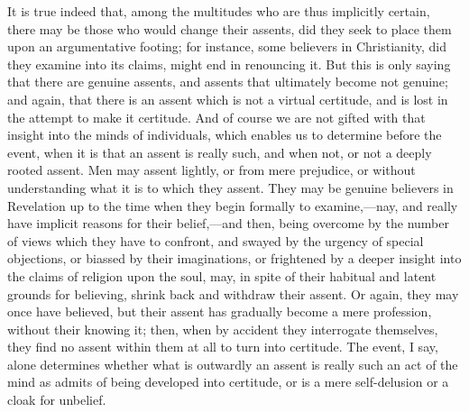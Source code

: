 It is true indeed that, among the multitudes who are thus
implicitly certain, there may be those who would change their assents,
did they seek to place them upon an argumentative footing; for
instance, some believers in Christianity, did they examine into its
claims, might end in renouncing it. But this is only saying that there
are genuine assents, and assents that ultimately become not genuine;
and again, that there is an assent which is not a virtual certitude,
and is lost in the attempt to make it certitude. And of course we are
not gifted with that insight into the minds of individuals, which
enables us to determine before the event, when it is that an assent is
really such, and when not, or not a deeply rooted assent. Men may
assent lightly, or from mere prejudice, or without understanding what
it is to which they assent. They may be genuine believers in
Revelation up to the time when they begin formally to examine,—nay,
and really have implicit reasons for their belief,—and then, being
overcome by the number of views which they have to confront, and
swayed by the urgency of special objections, or biassed by their
imaginations, or frightened by a deeper insight into the claims of
religion upon the soul, may, in spite of their habitual and latent
grounds for believing, shrink back and withdraw their assent. Or
again, they may once have believed, but their assent has
gradually become a mere profession, without their knowing it; then,
when by accident they interrogate themselves, they find no assent
within them at all to turn into certitude. The event, I say, alone
determines whether what is outwardly an assent is really such an act
of the mind as admits of being developed into certitude, or is a mere
self-delusion or a cloak for unbelief.

